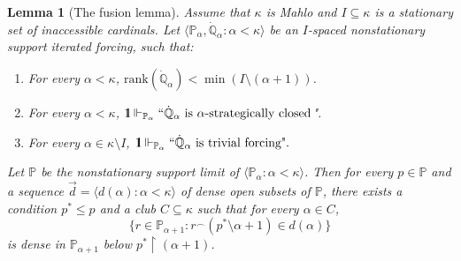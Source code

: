 \documentclass[11pt]{amsart}
\renewcommand{\restriction}{\mathbin\upharpoonright}    %
\newtheorem{lemma}[theorem]{Lemma}
\theoremstyle{definition}
\newcounter{condition}
\theoremstyle{remark}
\newcommand\<{{<}}
\newcommand{\one}{\mathop{1\hskip-3pt {\rm l}}}
\newcommand{\po}{\mathbb{P}}
\newcommand{\qo}{\mathbb{Q}}
\newcommand{\la}{\langle}
\newcommand{\ra}{\rangle}
\begin{document}
\begin{lemma}[The fusion lemma]\label{Lemma: fusion lemma}
    Assume that $\kappa$ is Mahlo and $I\subseteq \kappa$ is a stationary set of inaccessible cardinals. Let $\la \po_\alpha, \dot{\qo}_\alpha \colon \alpha<\kappa \ra$ be an $I$-spaced nonstationary support iterated forcing, such that:
    \begin{enumerate}
        \item For every $\alpha<\kappa$, $\mathrm{rank}(\dot{\qo}_\alpha) < \min(I \setminus (\alpha+1))$.
        \item For every $\alpha< \kappa$, $\one \Vdash_{\po_\alpha} {``\dot{\qo}_\alpha \text{ is }\alpha\text{-strategically closed}}$".
        \item For every $\alpha\in \kappa\setminus I$, $\one \Vdash_{\po_\alpha} {``\dot{\qo}_\alpha \text{ is trivial forcing".}}$
       
    \end{enumerate}
    Let $\po$ be the nonstationary support limit of $\la \po_\alpha \colon \alpha<\kappa \ra$. Then for every $p\in \po$ and a sequence $\vec{d} = \la d(\alpha)\colon \alpha<\kappa \ra$ of dense open subsets of $\po$, there exists a condition $p^*\leq p$ and a club $C\subseteq \kappa$ such that for every $\alpha\in C$, 
    $$\{ r\in \po_{\alpha+1} \colon r^{\smallfrown} (p^*\setminus \alpha+1) \in d(\alpha) \}$$
    is dense in $\po_{\alpha+1}$ below $p^*\restriction (\alpha+1)$.
\end{lemma}
\end{document}
